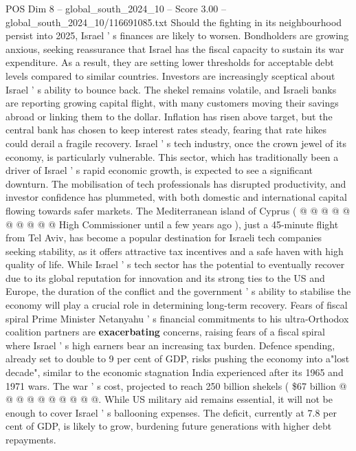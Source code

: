 \begin{textsample}{POS Dim 8 – global\_south\_2024\_10 – Score 3.00 – global\_south\_2024\_10/116691085.txt}  \label{ex:f8_pos_308}
Should the fighting in its neighbourhood persist into 2025, Israel ' s finances are likely to worsen.
Bondholders are growing anxious, seeking reassurance that Israel has the fiscal capacity to sustain its war expenditure.
As a result, they are setting lower thresholds for acceptable debt levels compared to similar countries.
Investors are increasingly sceptical about Israel ' s ability to bounce back.
The shekel remains volatile, and Israeli banks are reporting growing capital flight, with many customers moving their savings abroad or linking them to the dollar.
Inflation has risen above target, but the central bank has chosen to keep interest rates steady, fearing that rate hikes could derail a fragile recovery.
Israel ' s tech industry, once the crown jewel of its economy, is particularly vulnerable.
This sector, which has traditionally been a driver of Israel ' s rapid economic growth, is expected to see a significant downturn.
The mobilisation of tech professionals has disrupted productivity, and investor confidence has plummeted, with both domestic and international capital flowing towards safer markets.
The Mediterranean island of Cyprus ( @ @ @ @ @ @ @ @ @ @ High Commissioner until a few years ago ), just a 45-minute flight from Tel Aviv, has become a popular destination for Israeli tech companies seeking stability, as it offers attractive tax incentives and a safe haven with high quality of life.
While Israel ' s tech sector has the potential to eventually recover due to its global reputation for innovation and its strong ties to the US and Europe, the duration of the conflict and the government ' s ability to stabilise the economy will play a crucial role in determining long-term recovery.
Fears of fiscal spiral Prime Minister Netanyahu ' s financial commitments to his ultra-Orthodox coalition partners are \textbf{exacerbating} concerns, raising fears of a fiscal spiral where Israel ' s high earners bear an increasing tax burden.
Defence spending, already set to double to 9 per cent of GDP, risks pushing the economy into a"lost decade", similar to the economic stagnation India experienced after its 1965 and 1971 wars.
The war ' s cost, projected to reach 250 billion shekels ( \$67 billion @ @ @ @ @ @ @ @ @ @.
While US military aid remains essential, it will not be enough to cover Israel ' s ballooning expenses.
The deficit, currently at 7.8 per cent of GDP, is likely to grow, burdening future generations with higher debt repayments.

\end{textsample}
